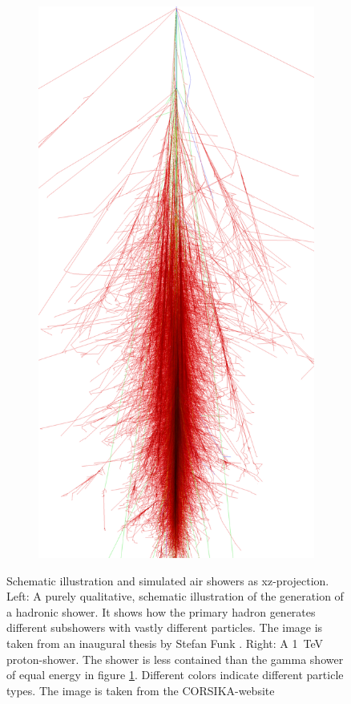 \begin{figure}
\begin{subfigure}{.3\textwidth}
		\includegraphics[width=.9\linewidth]{images/corsika_1tev_proton.png}
	\end{subfigure}
	\caption{Schematic illustration and simulated air showers as xz-projection.
		Left: A purely qualitative,
		schematic illustration of the generation of a hadronic shower.
		It shows how the primary hadron generates different subshowers
		with vastly different particles.
		The image is taken from an inaugural thesis 
		by Stefan Funk \cite{funk_doctor}.
		Right: A \SI{1}{\tera\electronvolt} proton-shower.
		The shower is less contained than the gamma shower of equal energy in 
		figure \ref{fig:gamma_shower}.
		Different colors indicate different particle types.
		The image is taken from 
		the CORSIKA-website \cite{corsika_showers}}
	\label{fig:gamma_shower}
\end{figure}

